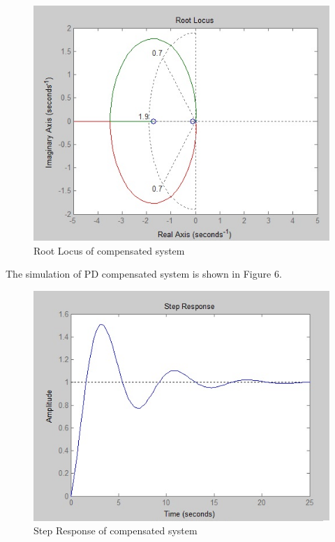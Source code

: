 \documentclass{article}
\begin{document}
\begin{figure}[h]
  \includegraphics[width=\linewidth]{root_locus_comp.jpg}
  \caption{Root Locus of compensated system}
  \label{fig:boat1}
\end{figure}

The simulation of PD compensated system is shown in Figure 6.

\begin{figure}[h]
  \includegraphics[width=\linewidth]{sim_com.jpg}
  \caption{Step Response of compensated system}
  \label{fig:boat1}
\end{figure}
\end{document}
